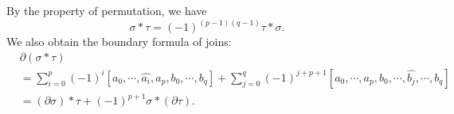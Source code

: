 \documentclass[reprint, amsmath, amssymb, showpacs, floatfix, longbibliography, aps, twocolumn, superscriptaddress, nofootinbib]{revtex4-2}
\newcommand{\ZZ}{{\mathbb Z}}
\theoremstyle{definition}
\begin{document}
By the property of permutation, we have
\begin{equation}
	\sigma*\tau=(-1)^{(p-1)(q-1)}\tau*\sigma.
\end{equation}
We also obtain the boundary formula of joins:
\begin{equation}\label{eqBoundaryJoin}
	\begin{aligned}
		&\partial (\sigma*\tau)\\&=\sum_{i=0}^p(-1)^i[a_0,\cdots,\hat{a_i},a_p,b_0,\cdots,b_q]+\sum_{j=0}^q(-1)^{j+p+1}[a_0,\cdots,a_p,b_0,\cdots,\hat{b_j},\cdots,b_q]\\&=(\partial \sigma )*\tau+(-1)^{p+1}\sigma*(\partial\tau).
	\end{aligned}
\end{equation}
%
%
%
% 
\end{document}
